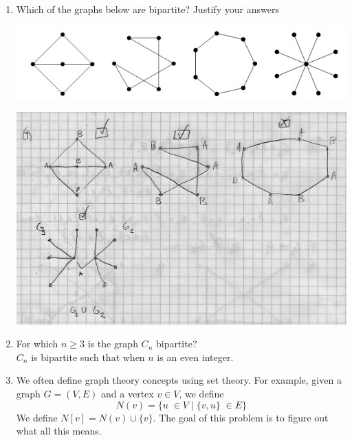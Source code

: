\documentclass[11pt,a4paper]{article}
\newcommand\setItemNumber[1]{\setcounter{enumi}{\numexpr#1-1\relax}}
\begin{document}
\begin{enumerate}
        \newpage
        \setItemNumber{7}
        \item Which of the graphs below are bipartite? Justify your answers

            \begin{center}
            \includegraphics[width=.5\textwidth]{hw8_graphic1}
            \end{center}

            \begin{center}
            \includegraphics[width=.5\textwidth]{hw8_graphic4}
            \end{center}


        \item For which $n\geq 3$ is the graph $C_n$ bipartite?\\
            $C_n$ is bipartite such that when $n$ is an even integer.

        \setItemNumber{12}
    \item We often define graph theory concepts using set theory. For example, given a graph $G = (V, E)$ and a vertex $v\in V$, we define
        $$N(v) = \{u\;\in V\; |\; \{v,u\}\;\in E\}$$
        We define $N[v] = N(v)\cup \{v\}$. The goal of this problem is to figure out what all this means.
        \begin{enumerate}


\end{enumerate}
\end{enumerate}
\end{document}
